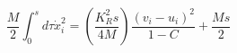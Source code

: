 \begin{equation}
\label{kinetic}
\frac{M}{2}\int_0^sd\tau \dot{x}_i^2=(\frac{K_R^2s}{4M})\frac{(v_i-u_i)^2}{1-C}+\frac{Ms}{2}
\end{equation}

